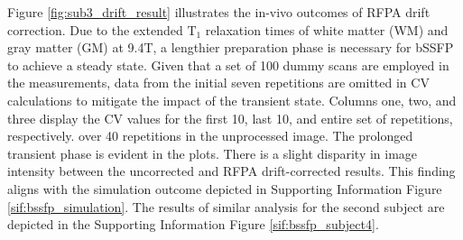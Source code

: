  
Figure \ref{fig:sub3_drift_result} illustrates the in-vivo outcomes of RFPA drift correction. Due to the extended $\text{T}_1$ relaxation times of white matter (WM) and gray matter (GM) at 9.4T\cite{zhu2014relaxation}, a lengthier preparation phase is necessary for bSSFP to achieve a steady state. Given that a set of 100 dummy scans are employed in the measurements, data from the initial seven repetitions are omitted in CV calculations to mitigate the impact of the transient state. Columns one, two, and three display the CV values for the first 10, last 10, and entire set of repetitions, respectively.  over 40 repetitions in the unprocessed image. The prolonged transient phase is evident in the plots. There is a slight disparity in image intensity between the uncorrected and RFPA drift-corrected results. This finding aligns with the simulation outcome depicted in Supporting Information Figure \ref{sif:bssfp_simulation}.  The results of similar analysis for the second subject are depicted in the Supporting Information Figure \ref{sif:bssfp_subject4}.

